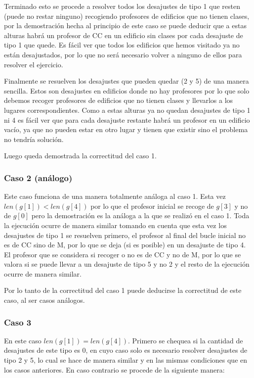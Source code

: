 \documentclass[11pt]{article}
\begin{document}
    Terminado esto se procede a resolver todos los desajustes de tipo 1 que resten (puede no restar ninguno) recogiendo profesores de edificios
    que no tienen clases, por la demostración hecha al principio de este caso se puede deducir que a estas alturas habrá un profesor de CC en un
    edificio sin clases por cada desajuste de tipo 1 que quede. Es fácil ver que todos los edificios que hemos visitado ya no están desajustados,
    por lo que no será necesario volver a ninguno de ellos para resolver el ejercicio.

    Finalmente se resuelven los desajustes que pueden quedar (2 y 5) de una manera sencilla. Estos son desajustes en
    edificios donde no hay profesores por lo que solo debemos recoger profesores de edificios que no tienen clases y
    llevarlos a los lugares correspondientes. Como a estas alturas ya no quedan desajustes de tipo 1 ni 4 es fácil ver
    que para cada desajuste restante habrá un profesor en un edificio vacío, ya que no pueden estar en otro lugar y tienen
    que existir sino el problema no tendría solución.

    Luego queda demostrada la correctitud del caso 1.

    \subsubsection{Caso 2 (análogo)}
    Este caso funciona de una manera totalmente análoga al caso 1. Esta vez $len(g[1]) < len(g[4])$ por lo que el profesor
    inicial se recoge de $g[3]$ y no de $g[0]$ pero la demostración es la análoga a la que se realizó en el caso 1.
    Toda la ejecución ocurre de manera similar tomando en cuenta que esta vez los desajustes de tipo 1 se resuelven primero,
    el profesor al final del bucle inicial no es de CC sino de M, por lo que se deja (si es posible) en un desajuste de tipo 4.
    El profesor que se considera si recoger o no es de CC y no de M, por lo que se valora si se puede llevar a un desajuste
    de tipo 5 y no 2 y el resto de la ejecución ocurre de manera similar.

    Por lo tanto de la correctitud del caso 1 puede deducirse la correctitud de este caso, al ser casos análogos.

    \subsubsection{Caso 3}
    En este caso $len(g[1]) = len(g[4])$. Primero se chequea si la cantidad de desajustes de este tipo es 0, en cuyo caso solo
    es necesario resolver desajustes de tipo 2 y 5, lo cual se hace de manera similar y en las mismas condiciones que en los
    casos anteriores. En caso contrario se procede de la siguiente manera:
\end{document}
